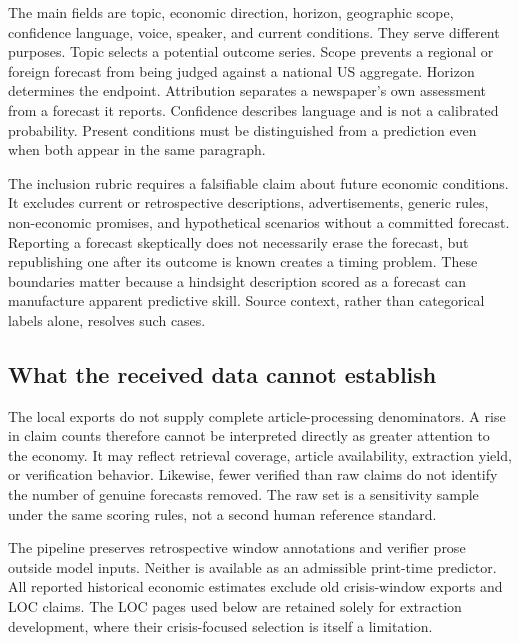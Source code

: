 The main fields are topic, economic direction, horizon, geographic scope, confidence language, voice, speaker, and current conditions. They serve different purposes. Topic selects a potential outcome series. Scope prevents a regional or foreign forecast from being judged against a national US aggregate. Horizon determines the endpoint. Attribution separates a newspaper's own assessment from a forecast it reports. Confidence describes language and is not a calibrated probability. Present conditions must be distinguished from a prediction even when both appear in the same paragraph.

The inclusion rubric requires a falsifiable claim about future economic conditions. It excludes current or retrospective descriptions, advertisements, generic rules, non-economic promises, and hypothetical scenarios without a committed forecast. Reporting a forecast skeptically does not necessarily erase the forecast, but republishing one after its outcome is known creates a timing problem. These boundaries matter because a hindsight description scored as a forecast can manufacture apparent predictive skill. Source context, rather than categorical labels alone, resolves such cases.

\subsection{What the received data cannot establish}
The local exports do not supply complete article-processing denominators. A rise in claim counts therefore cannot be interpreted directly as greater attention to the economy. It may reflect retrieval coverage, article availability, extraction yield, or verification behavior. Likewise, fewer verified than raw claims do not identify the number of genuine forecasts removed. The raw set is a sensitivity sample under the same scoring rules, not a second human reference standard.

The pipeline preserves retrospective window annotations and verifier prose outside model inputs. Neither is available as an admissible print-time predictor. All reported historical economic estimates exclude old crisis-window exports and LOC claims. The LOC pages used below are retained solely for extraction development, where their crisis-focused selection is itself a limitation.

